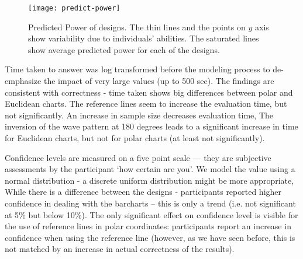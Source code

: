 \begin{figure*}[htbp] %
   \centering
   \texttt{[image: predict-power]} 
   \caption{Predicted Power of designs.  The thin lines and the points on $y$ axis show  variability due to individuals' abilities. The saturated lines show average predicted power for each of the designs.}
   \label{fig:power}
\end{figure*}

Time taken to answer was log transformed before the modeling process to de-emphasize the impact of very large values (up to 500 sec). The findings are consistent with correctness - time taken shows big differences between polar and Euclidean charts. The reference lines seem to increase the evaluation time, but not significantly. An increase in sample size decreases evaluation time, The inversion of the wave pattern at 180 degrees leads to a significant increase in time for Euclidean charts, but not for polar charts (at least not significantly). 


 Confidence levels are measured on a five point scale --- they are subjective assessments by the participant `how certain are you'. We model the value using a normal distribution - a discrete uniform distribution  might be more appropriate,
While there is a difference between the designs - participants reported higher confidence in dealing with the barcharts -- this is only  a trend (i.e. not significant at 5\% but below 10\%). The only significant effect on confidence level is visible for the use of reference lines in polar coordinates: participants report an increase in confidence when using the reference line (however, as we have seen before, this is not matched by an increase in actual correctness of the results).

